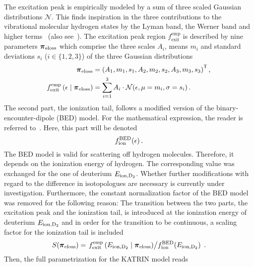 The excitation peak is empirically modeled by a sum of three scaled Gaussian distributions $\mathcal{N}$. This finds inspiration in the three contributions to the vibrational molecular hydrogen states by the Lyman band, the Werner band and higher terms~\cite{Hannen2019_1} (also see~\cite{Geiger1964}). The excitation peak region $f_\mathrm{exit}^\mathrm{emp}$ is described by nine parameters $\boldsymbol{\mathbf{\pi}}_\mathrm{eloss}$ which comprise the three scales $A_i$, means $m_i$ and standard deviations $s_i$ ($i \in \{1,2,3\}$) of the three Gaussian distributions~\cite{Hannen2019_2}
\newcommand{\katrinElossPhen}[1]{
		f_\mathrm{exit}^\mathrm{emp}\giventhat*{#1}{\nuisanceParamVec_\mathrm{eloss}}
}
\begin{align}
\label{eq:katrinElossElossModelParams}
\nuisanceParamVec_\mathrm{eloss} &= 
\transp{\left(
	A_1, m_1, s_1, 
	A_2, m_2, s_2, 
	A_3, m_3, s_3
	\right)}\comma \\
\katrinElossPhen{\epsilon} &=
\sum_{i=1}^3 A_i \cdot \mathcal{N}(\epsilon, \mu=m_i, \sigma=s_i)
\fullstop
\end{align}
The second part, the ionization tail, follows a modified version of the binary-encounter-dipole (BED) model. For the mathematical expression, the reader is referred to~\cite{Kim1994}. Here, this part will be denoted
\newcommand{\katrinElossBDE}[1]{
		f_\mathrm{ion}^\mathrm{BED}(#1)
}%
\begin{equation}
	\katrinElossBDE{\epsilon}
	\fullstop
\end{equation}%
The BED model is valid for scattering off hydrogen molecules. Therefore, it depends on the ionization energy of hydrogen. The corresponding value was exchanged for the one of deuterium $E_\mathrm{ion,D_2}$. Whether further modifications with regard to the difference in isotopologues are necessary is currently under investigation. Furthermore, the constant normalization factor of the BED model was removed for the following reason: The transition between the two parts, the excitation peak and the ionization tail, is introduced at the ionization energy of deuterium $E_\mathrm{ion,D_2}$ and in order for the transition to be continuous, a scaling factor for the ionization tail is included
\newcommand{\katrinElossScaleFactor}{
	S(\nuisanceParamVec_\mathrm{eloss})
}%
\begin{equation}
\katrinElossScaleFactor = \left.	
		\katrinElossPhen{\ionEnergyDeu}
\middle/
		\katrinElossBDE{\ionEnergyDeu}
\right.
\fullstop
\end{equation}
Then, the full parametrization for the KATRIN model reads~\cite{Hannen2019_1}

